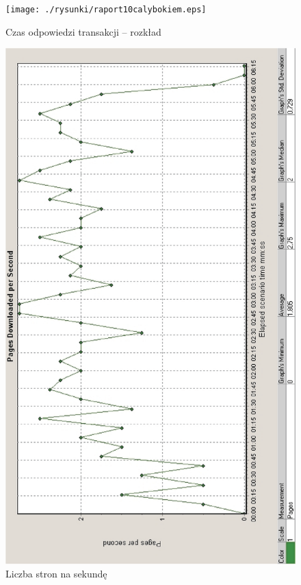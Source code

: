 \begin{figure}[h]
\centering
\texttt{[image: ./rysunki/raport10calybokiem.eps]}
\caption{Czas odpowiedzi transakcji -- rozkład}
\label{odpowiedz_transakcji_rozklad}
\end{figure}
\begin{figure}[h]
\centering
\includegraphics[width=4.5in]{./rysunki/raport11calybokiem.eps}
\caption{Liczba stron na sekundę}
\label{stron_sekunda}
\end{figure}


